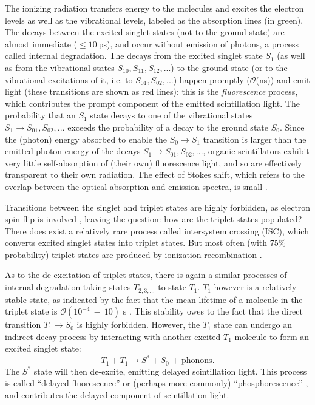 The ionizing radiation transfers energy to the molecules and excites the electron levels as well as the vibrational levels, labeled as the absorption lines (in green). The decays between the excited singlet states (not to the ground state) are almost immediate ($\leq 10~$ps), and occur without emission of photons, a process called internal degradation. The decays from the excited singlet state $S_1$ (as well as from the vibrational states $S_{10},S_{11},S_{12},...$) to the ground state (or to the vibrational excitations of it, i.e. to $S_{01}, S_{02}, ...$) happen promptly ($\mathcal{O}$(ns)) and emit light (these transitions are shown as red lines): this is the {\em fluorescence} process, which contributes the prompt component of the emitted scintillation light. The probability that an $S_1$ state decays to one of the vibrational states $S_1 \to S_{01},S_{02},...$ exceeds the probability of a decay to the ground state $S_0$. Since the (photon) energy absorbed to enable the $S_0 \to S_1$ transition is larger than the emitted photon energy of the decays $S_1 \to S_{01}, S_{02},...$, organic scintillators exhibit very little self-absorption of (their own) fluorescence light, and so are effectively transparent to their own radiation. The effect of Stokes shift, which refers to the overlap between the optical absorption and emission spectra, is small \cite{leo2012techniques,knoll2010radiation}. 

Transitions between the singlet and triplet states are highly forbidden, as electron spin-flip is involved \cite{von2015measurement,sorensen2016temperature}, leaving the question: how are the triplet states populated? There does exist a relatively rare process called intersystem crossing (ISC), which converts excited singlet states into triplet states. But most often (with 75\% probability) triplet states are produced by ionization-recombination \cite{von2015measurement,dunger2018topological}.

As to the de-excitation of triplet states, there is again a similar processes of internal degradation taking states $T_{2,3, ...}$ to state $T_1$. $T_1$ however is a relatively stable state, as indicated by the fact that the mean lifetime of a molecule in the triplet state is $\mathcal{O}(10^{-4}~-~10)$ s \cite{mcquarrie1997physical}. This stability owes to the fact that the direct transition $T_1\to S_0$ is highly forbidden. However, the $T_1$ state can undergo an indirect decay process by interacting with another excited $T_1$ molecule to form an excited singlet state:
\begin{equation}
T_1+T_1\to S^*+S_0 \text{ + phonons}.
\end{equation}
The $S^*$ state will then de-excite, emitting delayed scintillation light. This process is called ``delayed fluorescence'' or (perhaps more commonly) ``phosphorescence'' \cite{leo2012techniques}, and contributes the delayed component of scintillation light.

